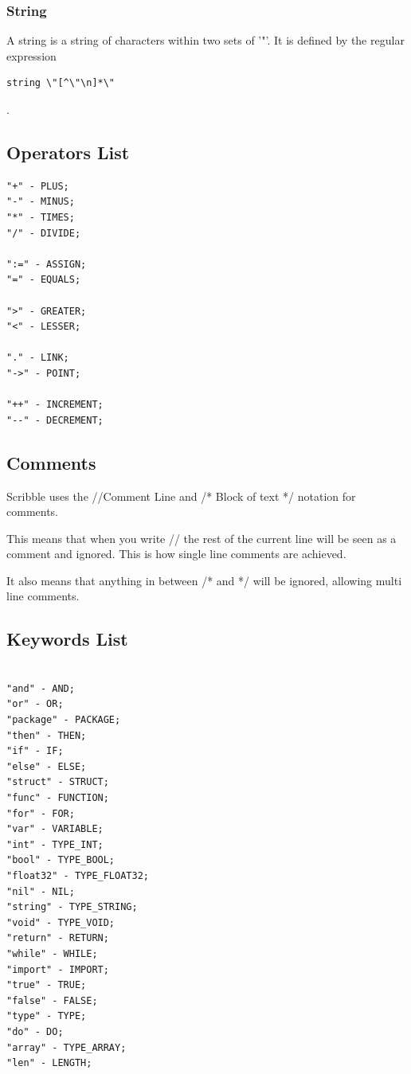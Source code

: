 \documentclass[]{final_report}
\begin{document}
\subsubsection{String}

A string is a string of characters within two sets of '"'. It is defined by the regular expression \begin{verbatim}
string \"[^\"\n]*\"
\end{verbatim}.

\subsection{Operators List}

\begin{verbatim}
"+" - PLUS;
"-" - MINUS;
"*" - TIMES;
"/" - DIVIDE;

":=" - ASSIGN;
"=" - EQUALS;

">" - GREATER;
"<" - LESSER;

"." - LINK;
"->" - POINT;

"++" - INCREMENT;
"--" - DECREMENT;
\end{verbatim}

\subsection{Comments}

Scribble uses the //Comment Line and /* Block of text */ notation for comments. 

This means that when you write // the rest of the current line will be seen as a comment and ignored. This is how single line comments are achieved.

It also means that anything in between /* and */ will be ignored, allowing multi line comments.

\subsection{Keywords List}

\begin{verbatim}

"and" - AND;
"or" - OR;
"package" - PACKAGE;
"then" - THEN;
"if" - IF;
"else" - ELSE;
"struct" - STRUCT;
"func" - FUNCTION;
"for" - FOR;
"var" - VARIABLE;
"int" - TYPE_INT;
"bool" - TYPE_BOOL;
"float32" - TYPE_FLOAT32;
"nil" - NIL;
"string" - TYPE_STRING;
"void" - TYPE_VOID;
"return" - RETURN;
"while" - WHILE;
"import" - IMPORT;
"true" - TRUE;
"false" - FALSE;
"type" - TYPE;
"do" - DO;
"array" - TYPE_ARRAY;
"len" - LENGTH;

\end{verbatim}
\end{document}
